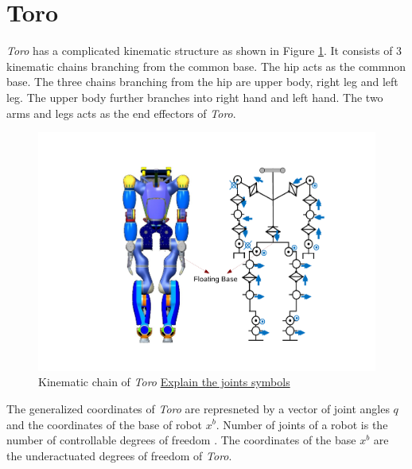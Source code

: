 \section{Toro}
\emph{Toro} has a complicated kinematic structure as shown in Figure \ref{fig:toro_kin}. It consists of 3 kinematic chains branching from the common base. The hip acts as the commnon base. The three chains branching from the hip are  upper body, right leg and left leg. The upper body further branches into right hand and left hand. The two arms and legs acts as the end effectors of \emph{Toro}.

\begin{figure}
\begin{center}
\includegraphics[trim= 70mm 10mm 40mm 10mm,clip,scale=0.7]{Bilder/TORO_kinematic.pdf}
\caption{Kinematic chain of \emph{Toro} \underline{Explain the joints symbols}}
\label{fig:toro_kin}
\end{center}
\end{figure}

The generalized coordinates of \emph{Toro} are represneted by a vector of joint angles $q$ and the coordinates of the base of robot $x^b$. Number of joints of a robot is the number of controllable degrees of freedom \cite[Chapter 2]{mur94}. The coordinates of the base $x^b$ are the underactuated degrees of freedom of \emph{Toro}. 

